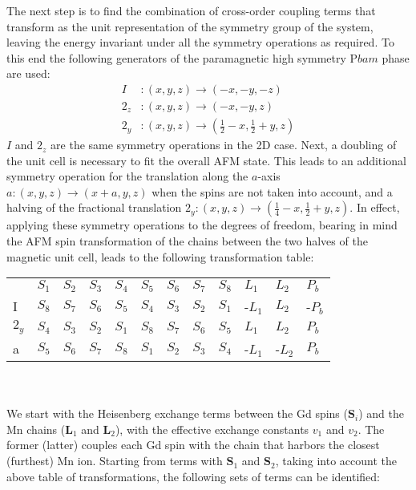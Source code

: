 The next step is to find the combination of cross-order coupling terms that transform as the unit representation of the symmetry group of the system, leaving the energy invariant under all the symmetry operations as required.
To this end the following generators of the paramagnetic high symmetry P$bam$ phase are used:
\begin{align}
	I &: (x, y, z) \rightarrow (-x, -y, -z)\\
	2_z &: (x, y, z) \rightarrow (-x, -y, z)\\
	2_y &: (x, y, z) \rightarrow (\frac{1}{2} - x, \frac{1}{2} + y, z)
\end{align}
$I$ and $2_z$ are the same symmetry operations in the 2D case. Next, a doubling of the unit cell is necessary to fit the overall AFM state. This leads to an additional symmetry operation for the translation along the $a$-axis $a: (x, y, z) \rightarrow (x + a, y, z)$ when the spins are not taken into account, and a halving of the fractional translation $2_y: (x, y, z) \rightarrow (\frac{1}{4} - x, \frac{1}{2}+y, z)$.
In effect, applying these symmetry operations to the degrees of freedom, bearing in mind the AFM spin transformation of the chains between the two halves of the magnetic unit cell, leads to the following transformation table:
\begin{table}[h]
\centering
\begin{tabular}{|l|lllllllllll|}
\cline{1-12}
 & $S_1$ & $S_2$ & $S_3$ & $S_4$ & $S_5$ & $S_6$ & $S_7$ & $S_8$ & $L_1$ & $L_2$ & $P_b$ \\ \cline{1-12}
I & $S_8$ & $S_7$ & $S_6$ & $S_5$ & $S_4$ & $S_3$ & $S_2$ & $S_1$ & -$L_1$ & $L_2$ & -$P_b$ \\ \cline{1-12}
$2_y$ & $S_4$ & $S_3$ & $S_2$ & $S_1$ & $S_8$ & $S_7$ & $S_6$ & $S_5$ & $L_1$ & $L_2$ & $P_b$ \\ \cline{1-12}
a & $S_5$ & $S_6$ & $S_7$ & $S_8$ & $S_1$ & $S_2$ & $S_3$ & $S_4$ & -$L_1$ & -$L_2$ & $P_b$ \\ \cline{1-12}
\end{tabular}
\end{table}\\\\
We start with the Heisenberg exchange terms between the Gd spins ($\bm{S}_i$) and the Mn chains ($\bm{L}_1$ and $\bm{L}_2$), with the effective exchange constants $v_1$ and $v_2$.
The former (latter) couples each Gd spin with the chain that harbors the closest (furthest) Mn ion.
Starting from terms with $\bm{S}_1$ and $\bm{S}_2$, taking into account the above table of transformations, the following sets of terms can be identified:
